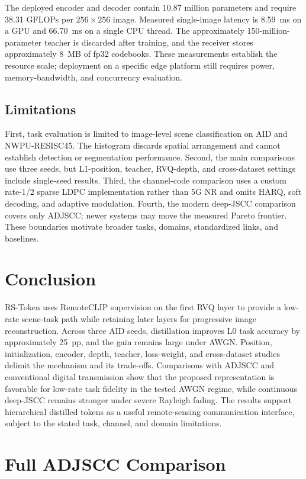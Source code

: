 \documentclass[letterpaper,journal]{IEEEtran}
\newcommand{\pp}{~pp\xspace}
\begin{document}
The deployed encoder and decoder contain 10.87 million parameters and require 38.31 GFLOPs per $256\times256$ image. Measured single-image latency is 8.59~ms on a GPU and 66.70~ms on a single CPU thread. The approximately 150-million-parameter teacher is discarded after training, and the receiver stores approximately 8~MB of fp32 codebooks. These measurements establish the resource scale; deployment on a specific edge platform still requires power, memory-bandwidth, and concurrency evaluation.

\subsection{Limitations}
First, task evaluation is limited to image-level scene classification on AID and NWPU-RESISC45. The histogram discards spatial arrangement and cannot establish detection or segmentation performance. Second, the main comparisons use three seeds, but L1-position, teacher, RVQ-depth, and cross-dataset settings include single-seed results. Third, the channel-code comparison uses a custom rate-1/2 sparse LDPC implementation rather than 5G NR and omits HARQ, soft decoding, and adaptive modulation. Fourth, the modern deep-JSCC comparison covers only ADJSCC; newer systems may move the measured Pareto frontier. These boundaries motivate broader tasks, domains, standardized links, and baselines.

\section{Conclusion}
\label{sec:conclusion}
RS-Token uses RemoteCLIP supervision on the first RVQ layer to provide a low-rate scene-task path while retaining later layers for progressive image reconstruction. Across three AID seeds, distillation improves L0 task accuracy by approximately 25\pp, and the gain remains large under AWGN. Position, initialization, encoder, depth, teacher, loss-weight, and cross-dataset studies delimit the mechanism and its trade-offs. Comparisons with ADJSCC and conventional digital transmission show that the proposed representation is favorable for low-rate task fidelity in the tested AWGN regime, while continuous deep-JSCC remains stronger under severe Rayleigh fading. The results support hierarchical distilled tokens as a useful remote-sensing communication interface, subject to the stated task, channel, and domain limitations.

\appendices

\section{Full ADJSCC Comparison}
\label{app:adjscc}
\end{document}
